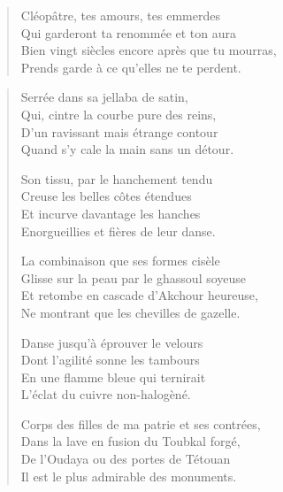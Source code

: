 \begin{verse}
  Cléopâtre, tes amours, tes emmerdes\\ 
  Qui garderont ta renommée et ton aura\\ 
  Bien vingt siècles encore après que tu mourras,\\ 
  Prends garde à ce qu’elles ne te perdent.  %
\end{verse}

\begin{verse}\quatrain
  Serrée dans sa jellaba de satin,\\ 
  Qui, cintre la courbe pure des reins,\\ 
  D’un ravissant mais étrange contour\\ 
  Quand s’y cale la main sans un détour.  %

  Son tissu, par le hanchement tendu\\ 
  Creuse les belles côtes étendues\\ 
  Et incurve davantage les hanches\\ 
  Enorgueillies et fières de leur danse.  %

  La combinaison que ses formes cisèle\\ 
  Glisse sur la peau par le ghassoul%
   soyeuse\\  %
  Et retombe en cascade d’Akchour heureuse,\\ 
  Ne montrant que les chevilles de gazelle.  %

  Danse jusqu’à éprouver le velours\\ 
  Dont l’agilité sonne les tambours\\ 
  En une flamme bleue qui ternirait\\ 
  L’éclat du cuivre non-halogèné.  %

  Corps des filles de ma patrie et ses contrées,\\ 
  Dans la lave en fusion du Toubkal forgé,\\ 
  De l’Oudaya ou des portes de Tétouan\\ 
  Il est le plus admirable des monuments.  %
\end{verse}

